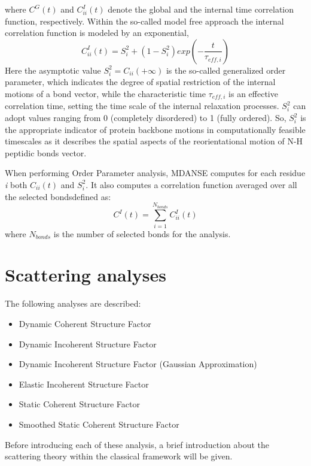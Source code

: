 \documentclass[a4paper,11pt]{article}
\begin{document}
where $C^G(t)$ and $C^I_{ii}(t)$ denote the global and the internal time correlation function, respectively. Within
the so-called model free approach \cite{Szabo:1982,Szabo:1982bis} the internal correlation function is modeled by an 
exponential, 
\begin{equation}
C^I_{ii}(t) = S^2_i +(1 - S^2_i)exp\left(-\frac{t}{\tau_{eff,i}}\right)
\end{equation}
Here the asymptotic value $S^2_i =C_{ii}(+\infty)$ is the so-called generalized order parameter, which indicates the 
degree of spatial restriction of the internal motions of a bond vector, while the characteristic time $\tau_{eff,i}$ is an 
effective correlation time, setting the time scale of the internal relaxation processes. $S^2_i$ can adopt values ranging from 
0 (completely disordered) to 1 (fully ordered). So, $S^2_i$ is the appropriate indicator of protein backbone motions in 
computationally feasible timescales as it describes the spatial aspects of the reorientational motion of N-H peptidic 
bonds vector.

When performing Order Parameter analysis, \gls{MDANSE} computes for each residue \textit{i} both $C_{ii}(t)$ and $S^2_i$. 
It also computes a correlation function averaged over all the selected bondsdefined as:
\begin{equation}
\label{eq:op_cii_avg}
C^I(t) = \sum_{i = 1}^{N_{bonds}} C^I_{ii}(t)
\end{equation}
where $N_{bonds}$ is the number of selected bonds for the analysis.

\section{Scattering analyses}
\label{scattering_menu}
The following analyses are described:
\begin{itemize}
\item Dynamic Coherent Structure Factor
\item Dynamic Incoherent Structure Factor
\item Dynamic Incoherent Structure Factor (Gaussian Approximation)
\item Elastic Incoherent Structure Factor
\item Static Coherent Structure Factor
\item Smoothed Static Coherent Structure Factor
\end{itemize}
Before introducing each of these analysis, a brief introduction about the scattering theory within the classical framework will be given.
\end{document}
